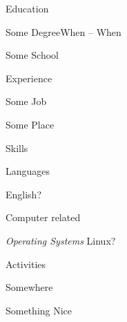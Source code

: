 \documentclass[letterpaper,12pt,oneside,compact]{article}
\begin{document}
\maketitle

\begin{heading}{Education}
\begin{resitem}{Some Degree\hfill When -- When}
\item Some School
\end{resitem}
\end{heading}


\nocite{Some Bib File Entry}


\begin{heading}{Experience}
\begin{resitem}{Some Job}
\item Some Place
\end{resitem}
\end{heading}

\begin{heading}{Skills}
\begin{resitem}{Languages}
\item English?
\end{resitem}
\begin{resitem}{Computer related}
\item \emph{Operating Systems}\hspace*{10pt} Linux?
\end{resitem}
\end{heading}

\begin{heading}{Activities}
\begin{resitem}{Somewhere}
\item Something Nice
\end{resitem}
\end{heading}
\end{document}
